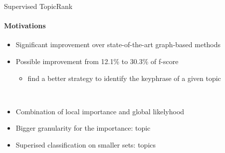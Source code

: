   \begin{frame}{Supervised TopicRank}
    \framesubtitle{Motivations}

    \begin{itemize}
      \item<+->{Significant improvement over state-of-the-art graph-based methods}
      \item<+->{Possible improvement from 12.1\% to 30.3\% of f-score}
      \begin{itemize}
        \item{find a better strategy to identify the keyphrase of a given topic}
      \end{itemize}
    \end{itemize}~\\

    \begin{itemize}
      \item<+->{Combination of local importance and global likelyhood}
      \item<+->{Bigger granularity for the importance: topic}
      \item<+->{Superised classification on smaller sets: topics}
    \end{itemize}
  \end{frame}

